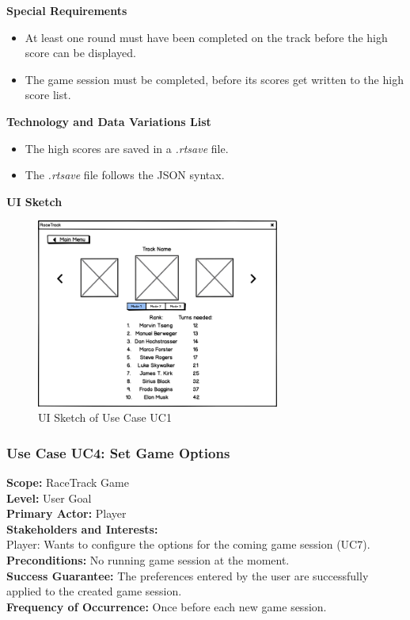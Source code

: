 			\textbf{Special Requirements}
				\begin{itemize}
					\item At least one round must have been completed on the track before the high score can be displayed.
					\item The game session must be completed, before its scores get written to the high score list.
				\end{itemize}

			\textbf{Technology and Data Variations List}
				\begin{itemize}
					\item The high scores are saved in a \textit{.rtsave} file.
					\item The \textit{.rtsave} file follows the JSON syntax.
				\end{itemize}

			\textbf{UI Sketch}
				\begin{figure}[H]
					\centering
					\includegraphics[width=8cm,keepaspectratio,center]{img/Use-Case-Model_UC1_UI-Sketch.png}
					\caption{UI Sketch of Use Case UC1}
				\end{figure}

		\subsubsection{Use Case UC4: Set Game Options}
			\textbf{Scope:} RaceTrack Game \\
			\textbf{Level:} User Goal \\
			\textbf{Primary Actor:} Player \\
			\textbf{Stakeholders and Interests:} \\
			Player: Wants to configure the options for the coming game session (UC7). \\
			\textbf{Preconditions:} No running game session at the moment. \\
			\textbf{Success Guarantee:} The preferences entered by the user are successfully applied to the created game session. \\
			\textbf{Frequency of Occurrence:} Once before each new game session.
			\newline
	
